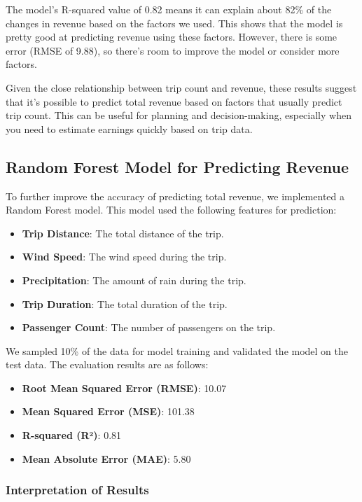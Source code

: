 \documentclass[11pt]{article}
\begin{document}
The model’s R-squared value of 0.82 means it can explain about 82\% of the changes in revenue based on the factors we used. This shows that the model is pretty good at predicting revenue using these factors. However, there is some error (RMSE of 9.88), so there’s room to improve the model or consider more factors.

Given the close relationship between trip count and revenue, these results suggest that it’s possible to predict total revenue based on factors that usually predict trip count. This can be useful for planning and decision-making, especially when you need to estimate earnings quickly based on trip data.

\subsection{Random Forest Model for Predicting Revenue}

To further improve the accuracy of predicting total revenue, we implemented a Random Forest model. This model used the following features for prediction:

\begin{itemize}
    \item \textbf{Trip Distance}: The total distance of the trip.
    \item \textbf{Wind Speed}: The wind speed during the trip.
    \item \textbf{Precipitation}: The amount of rain during the trip.
    \item \textbf{Trip Duration}: The total duration of the trip.
    \item \textbf{Passenger Count}: The number of passengers on the trip.
\end{itemize}

We sampled 10\% of the data for model training and validated the model on the test data. The evaluation results are as follows:

\begin{itemize}
    \item \textbf{Root Mean Squared Error (RMSE)}: 10.07
    \item \textbf{Mean Squared Error (MSE)}: 101.38
    \item \textbf{R-squared (R²)}: 0.81
    \item \textbf{Mean Absolute Error (MAE)}: 5.80
\end{itemize}

\subsubsection{Interpretation of Results}
\end{document}
